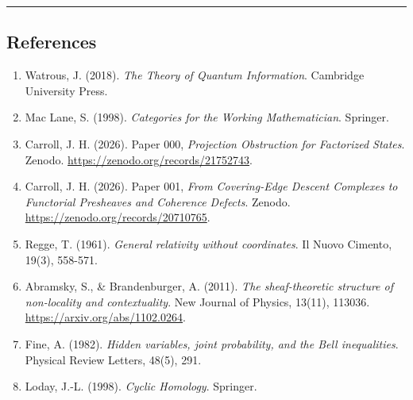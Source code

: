 \documentclass[
  english,
  10pt,
  a4paper,
]{article}
\providecommand{\tightlist}{%
  \setlength{\itemsep}{0pt}\setlength{\parskip}{0pt}}
\providecommand{\tightlist}{%
  \setlength{\itemsep}{0pt}\setlength{\parskip}{0pt}}
\begin{document}
\begin{center}\rule{0.5\linewidth}{0.5pt}\end{center}

\subsection{References}\label{references}

\begin{enumerate}
\def\labelenumi{\arabic{enumi}.}
\tightlist
\item
  Watrous, J. (2018). \emph{The Theory of Quantum Information}.
  Cambridge University Press.
\item
  Mac Lane, S. (1998). \emph{Categories for the Working Mathematician}.
  Springer.
\item
  Carroll, J. H. (2026). Paper 000, \emph{Projection Obstruction for
  Factorized States}. Zenodo. \url{https://zenodo.org/records/21752743}.
\item
  Carroll, J. H. (2026). Paper 001, \emph{From Covering-Edge Descent
  Complexes to Functorial Presheaves and Coherence Defects}. Zenodo.
  \url{https://zenodo.org/records/20710765}.
\item
  Regge, T. (1961). \emph{General relativity without coordinates}. Il
  Nuovo Cimento, 19(3), 558-571.
\item
  Abramsky, S., \& Brandenburger, A. (2011). \emph{The sheaf-theoretic
  structure of non-locality and contextuality}. New Journal of Physics,
  13(11), 113036. \url{https://arxiv.org/abs/1102.0264}.
\item
  Fine, A. (1982). \emph{Hidden variables, joint probability, and the
  Bell inequalities}. Physical Review Letters, 48(5), 291.
\item
  Loday, J.-L. (1998). \emph{Cyclic Homology}. Springer.
\end{enumerate}
\end{document}
